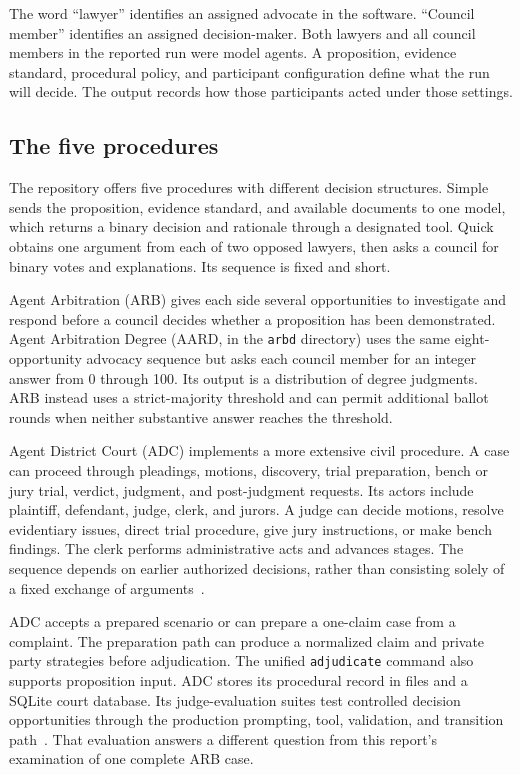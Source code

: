 \documentclass[11pt]{article}
\newcommand{\code}[1]{\texttt{#1}}
\begin{document}
The word ``lawyer'' identifies an assigned advocate in the software.  ``Council member'' identifies an assigned decision-maker.  Both lawyers and all council members in the reported run were model agents.  A proposition, evidence standard, procedural policy, and participant configuration define what the run will decide.  The output records how those participants acted under those settings.

\subsection{The five procedures}

The repository offers five procedures with different decision structures.  Simple sends the proposition, evidence standard, and available documents to one model, which returns a binary decision and rationale through a designated tool.  Quick obtains one argument from each of two opposed lawyers, then asks a council for binary votes and explanations.  Its sequence is fixed and short.

Agent Arbitration (ARB) gives each side several opportunities to investigate and respond before a council decides whether a proposition has been demonstrated.  Agent Arbitration Degree (AARD, in the \code{arbd} directory) uses the same eight-opportunity advocacy sequence but asks each council member for an integer answer from 0 through 100.  Its output is a distribution of degree judgments.  ARB instead uses a strict-majority threshold and can permit additional ballot rounds when neither substantive answer reaches the threshold.

Agent District Court (ADC) implements a more extensive civil procedure.  A case can proceed through pleadings, motions, discovery, trial preparation, bench or jury trial, verdict, judgment, and post-judgment requests.  Its actors include plaintiff, defendant, judge, clerk, and jurors.  A judge can decide motions, resolve evidentiary issues, direct trial procedure, give jury instructions, or make bench findings.  The clerk performs administrative acts and advances stages.  The sequence depends on earlier authorized decisions, rather than consisting solely of a fixed exchange of arguments~\cite{adc}.

ADC accepts a prepared scenario or can prepare a one-claim case from a complaint.  The preparation path can produce a normalized claim and private party strategies before adjudication.  The unified \code{adjudicate} command also supports proposition input.  ADC stores its procedural record in files and a SQLite court database.  Its judge-evaluation suites test controlled decision opportunities through the production prompting, tool, validation, and transition path~\cite{evalpaper}.  That evaluation answers a different question from this report's examination of one complete ARB case.
\end{document}
